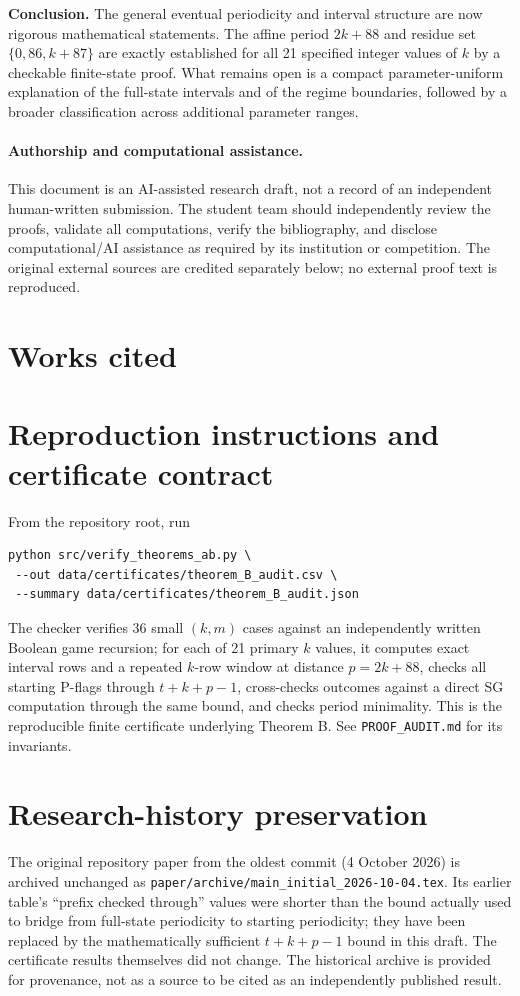 \documentclass[11pt]{article}
\begin{document}
\textbf{Conclusion.}  The general eventual periodicity and interval
structure are now rigorous mathematical statements.  The affine period
$2k+88$ and residue set $\{0,86,k+87\}$ are exactly established for all
21 specified integer values of $k$ by a checkable finite-state proof.
What remains open is a compact parameter-uniform explanation of the
full-state intervals and of the regime boundaries, followed by a broader
classification across additional parameter ranges.

\paragraph{Authorship and computational assistance.}
This document is an AI-assisted research draft, not a record of an
independent human-written submission.  The student team should independently
review the proofs, validate all computations, verify the bibliography,
and disclose computational/AI assistance as required by its institution or
competition.  The original external sources are credited separately below;
no external proof text is reproduced.

\section*{Works cited}


\appendix
\section{Reproduction instructions and certificate contract}
From the repository root, run
\begin{verbatim}
python src/verify_theorems_ab.py \
 --out data/certificates/theorem_B_audit.csv \
 --summary data/certificates/theorem_B_audit.json
\end{verbatim}
The checker verifies 36 small $(k,m)$ cases against an independently
written Boolean game recursion; for each of 21 primary $k$ values, it
computes exact interval rows and a repeated $k$-row window at distance
$p=2k+88$, checks all starting P-flags through $t+k+p-1$, cross-checks
outcomes against a direct SG computation through the same bound, and
checks period minimality.  This is the reproducible finite certificate
underlying Theorem B.  See \texttt{PROOF\_AUDIT.md} for its invariants.

\section{Research-history preservation}
The original repository paper from the oldest commit (4 October 2026)
is archived unchanged as \texttt{paper/archive/main\_initial\_2026-10-04.tex}.
Its earlier table's ``prefix checked through'' values were shorter than
the bound actually used to bridge from full-state periodicity to starting
periodicity; they have been replaced by the mathematically sufficient
$t+k+p-1$ bound in this draft.  The certificate results themselves did
not change. The historical archive is provided for provenance, not as
a source to be cited as an independently published result.
\end{document}
